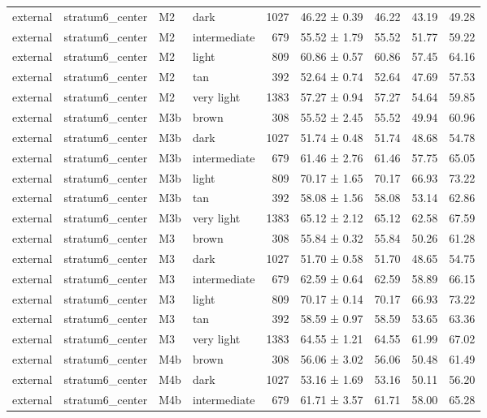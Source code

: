 \begin{tabular}{llllrlrrr}
external & stratum6\_center & M2 & dark & 1027 & 46.22 ± 0.39 & 46.22 & 43.19 & 49.28 \\
external & stratum6\_center & M2 & intermediate & 679 & 55.52 ± 1.79 & 55.52 & 51.77 & 59.22 \\
external & stratum6\_center & M2 & light & 809 & 60.86 ± 0.57 & 60.86 & 57.45 & 64.16 \\
external & stratum6\_center & M2 & tan & 392 & 52.64 ± 0.74 & 52.64 & 47.69 & 57.53 \\
external & stratum6\_center & M2 & very light & 1383 & 57.27 ± 0.94 & 57.27 & 54.64 & 59.85 \\
external & stratum6\_center & M3b & brown & 308 & 55.52 ± 2.45 & 55.52 & 49.94 & 60.96 \\
external & stratum6\_center & M3b & dark & 1027 & 51.74 ± 0.48 & 51.74 & 48.68 & 54.78 \\
external & stratum6\_center & M3b & intermediate & 679 & 61.46 ± 2.76 & 61.46 & 57.75 & 65.05 \\
external & stratum6\_center & M3b & light & 809 & 70.17 ± 1.65 & 70.17 & 66.93 & 73.22 \\
external & stratum6\_center & M3b & tan & 392 & 58.08 ± 1.56 & 58.08 & 53.14 & 62.86 \\
external & stratum6\_center & M3b & very light & 1383 & 65.12 ± 2.12 & 65.12 & 62.58 & 67.59 \\
external & stratum6\_center & M3 & brown & 308 & 55.84 ± 0.32 & 55.84 & 50.26 & 61.28 \\
external & stratum6\_center & M3 & dark & 1027 & 51.70 ± 0.58 & 51.70 & 48.65 & 54.75 \\
external & stratum6\_center & M3 & intermediate & 679 & 62.59 ± 0.64 & 62.59 & 58.89 & 66.15 \\
external & stratum6\_center & M3 & light & 809 & 70.17 ± 0.14 & 70.17 & 66.93 & 73.22 \\
external & stratum6\_center & M3 & tan & 392 & 58.59 ± 0.97 & 58.59 & 53.65 & 63.36 \\
external & stratum6\_center & M3 & very light & 1383 & 64.55 ± 1.21 & 64.55 & 61.99 & 67.02 \\
external & stratum6\_center & M4b & brown & 308 & 56.06 ± 3.02 & 56.06 & 50.48 & 61.49 \\
external & stratum6\_center & M4b & dark & 1027 & 53.16 ± 1.69 & 53.16 & 50.11 & 56.20 \\
external & stratum6\_center & M4b & intermediate & 679 & 61.71 ± 3.57 & 61.71 & 58.00 & 65.28 \\

\end{tabular}
